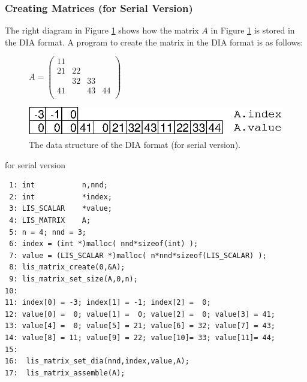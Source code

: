 \documentclass[a4paper]{article}
\begin{document}
\subsubsection{Creating Matrices (for Serial Version)}
The right diagram in Figure \ref{fig:storage04} shows how the matrix $A$
in Figure \ref{fig:storage04} is stored in the DIA format. A program to create the matrix in the DIA format is as follows:
\begin{figure}[h]
{\centering 
\begin{minipage}{0.3\textwidth}
\begin{flushright}
$ 
A = \left(
\begin{array}{cccc}
11 &    &    &    \\
21 & 22 &    &    \\
   & 32 & 33 &    \\
41 &    & 43 & 44 \\
\end{array}\right)
$
\end{flushright}
\end{minipage}
\begin{minipage}{0.6\textwidth}
\begin{flushleft}
\includegraphics{storage04.eps} 
\end{flushleft}
\end{minipage}
\caption{The data structure of the DIA format (for serial version).}\label{fig:storage04}}
\end{figure}
\begin{itembox}[l]{for serial version}
\small
\begin{verbatim}
 1: int           n,nnd;
 2: int           *index;
 3: LIS_SCALAR    *value;
 4: LIS_MATRIX    A;
 5: n = 4; nnd = 3;
 6: index = (int *)malloc( nnd*sizeof(int) );
 7: value = (LIS_SCALAR *)malloc( n*nnd*sizeof(LIS_SCALAR) );
 8: lis_matrix_create(0,&A);
 9: lis_matrix_set_size(A,0,n);
10:
11: index[0] = -3; index[1] = -1; index[2] =  0;
12: value[0] =  0; value[1] =  0; value[2] =  0; value[3] = 41;
13: value[4] =  0; value[5] = 21; value[6] = 32; value[7] = 43;
14: value[8] = 11; value[9] = 22; value[10]= 33; value[11]= 44;
15:
16:  lis_matrix_set_dia(nnd,index,value,A);
17:  lis_matrix_assemble(A);
\end{verbatim}
\end{itembox}
\newpage
\end{document}
